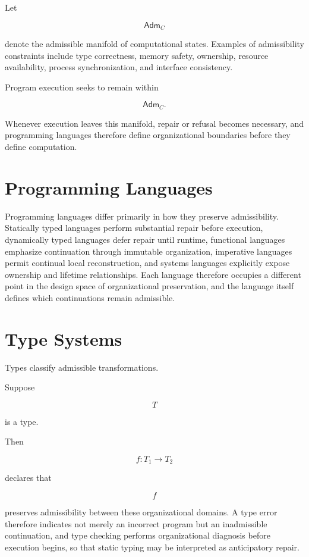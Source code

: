 \documentclass[11pt,oneside]{book}
\numberwithin{equation}{chapter}
\theoremstyle{definition}
\theoremstyle{plain}
\newcommand{\Adm}{\mathsf{Adm}}
\begin{document}
Let

\[
\Adm_C
\]

denote the admissible manifold of computational states. Examples of admissibility constraints include type correctness, memory safety, ownership, resource availability, process synchronization, and interface consistency.

Program execution seeks to remain within

\[
\Adm_C.
\]

Whenever execution leaves this manifold, repair or refusal becomes necessary, and programming languages therefore define organizational boundaries before they define computation.

\section{Programming Languages}

Programming languages differ primarily in how they preserve admissibility. Statically typed languages perform substantial repair before execution, dynamically typed languages defer repair until runtime, functional languages emphasize continuation through immutable organization, imperative languages permit continual local reconstruction, and systems languages explicitly expose ownership and lifetime relationships. Each language therefore occupies a different point in the design space of organizational preservation, and the language itself defines which continuations remain admissible.

\section{Type Systems}

Types classify admissible transformations.

Suppose

\[
T
\]

is a type.

Then

\[
f:T_1
\rightarrow
T_2
\]

declares that

\[
f
\]

preserves admissibility between these organizational domains. A type error therefore indicates not merely an incorrect program but an inadmissible continuation, and type checking performs organizational diagnosis before execution begins, so that static typing may be interpreted as anticipatory repair.
\end{document}
